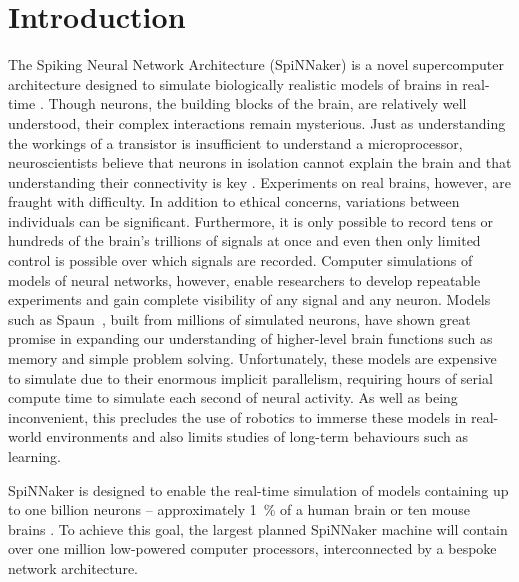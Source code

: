 \chapter{Introduction}

\label{sec:introduction}

%

The Spiking Neural Network Architecture (SpiNNaker) is a novel supercomputer
architecture designed to simulate biologically realistic models of brains in
real-time \cite{furber07}. Though neurons, the building blocks of the brain,
are relatively well understood, their complex interactions remain mysterious.
Just as understanding the workings of a transistor is insufficient to
understand a microprocessor, neuroscientists believe that neurons in isolation
cannot explain the brain and that understanding their connectivity is key
\cite{eliasmith13,eliasmith14}. Experiments on real brains, however, are
fraught with difficulty. In addition to ethical concerns, variations between
individuals can be significant. Furthermore, it is only possible to record tens
or hundreds of the brain's trillions of signals at once and even then only
limited control is possible over which signals are recorded. Computer
simulations of models of neural networks, however, enable researchers to
develop repeatable experiments and gain complete visibility of any signal and
any neuron. Models such as Spaun~\cite{eliasmith12}, built from millions of
simulated neurons, have shown great promise in expanding our understanding of
higher-level brain functions such as memory and simple problem solving.
Unfortunately, these models are expensive to simulate due to their enormous
implicit parallelism, requiring hours of serial compute time to simulate each
second of neural activity. As well as being inconvenient, this precludes the
use of robotics to immerse these models in real-world environments and also
limits studies of long-term behaviours such as learning.

SpiNNaker is designed to enable the real-time simulation of models containing
up to one billion neurons -- approximately \SI{1}{\percent} of a human brain or
ten mouse brains \cite{furber06}. To achieve this goal, the largest planned
SpiNNaker machine will contain over one million low-powered computer
processors, interconnected by a bespoke network architecture.


